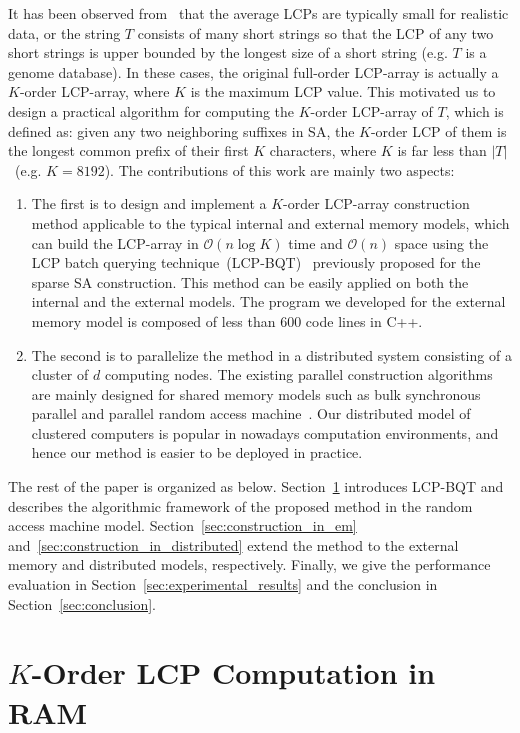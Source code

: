 \documentclass[10pt,journal,compsoc]{IEEEtran}
\begin{document}
\begin{CJK*}{GBK}{song}
{\color{red}
It has been observed from~\cite{Felipe2013} that the average LCPs are typically small for realistic data, or the string $T$ consists of many short strings so that the LCP of any two short strings is upper bounded by the longest size of a short string (e.g. $T$ is a genome database). In these cases, the original full-order LCP-array is actually a $K$-order LCP-array, where $K$ is the maximum LCP value.}
This motivated us to design a practical algorithm for computing the $K$-order LCP-array of $T$, which is defined as: given any two neighboring suffixes in SA, the $K$-order LCP of them is the longest common prefix of their first $K$ characters, where $K$ is far less than $|T|$~(e.g. $K=8192$). The contributions of this work are mainly two aspects:
\begin{enumerate}
\item The first is to design and implement a $K$-order LCP-array construction method applicable to the typical internal and external memory models, which can build the LCP-array in $\mathcal{O}(n\log K)$ time and $\mathcal{O}(n)$ space using the LCP batch querying technique~(LCP-BQT)~\cite{Philip2013} previously proposed for the sparse SA construction. This method can be easily applied on both the internal and the external models. The program we developed for the external memory model is composed of less than 600 code lines in C++.
\item {\color{red} The second is to parallelize the method in a distributed system consisting of a cluster of $d$ computing nodes. The existing parallel construction algorithms are mainly designed for shared memory models such as bulk synchronous parallel and parallel random access machine~\cite{Shun2014,Deo2013}. Our distributed model of clustered computers is popular in nowadays computation environments, and hence our method is easier to be deployed in practice.}
\end{enumerate}

The rest of the paper is organized as below. Section~\ref{sec:construction_in_ram} introduces LCP-BQT and describes the algorithmic framework of the proposed method in the random access machine model. Section~\ref{sec:construction_in_em} and~\ref{sec:construction_in_distributed} extend the method to the external memory and distributed models, respectively. Finally, we give the performance evaluation in Section~\ref{sec:experimental_results} and the conclusion in Section~\ref{sec:conclusion}.

\section{$K$-Order LCP Computation in RAM}\label{sec:construction_in_ram}


\end{CJK*}
\end{document}
